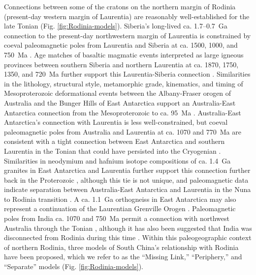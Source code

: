 Connections between some of the cratons on the northern margin of Rodinia (present-day western margin of Laurentia) are reasonably well-established for the late Tonian (Fig. \ref{fig:Rodinia-models}). Siberia's long-lived ca. 1.7--0.7~Ga connection to the present-day northwestern margin of Laurentia is constrained by coeval paleomagnetic poles from Laurentia and Siberia at ca. 1500, 1000, and 750~Ma \citep{Evans2016a}. Age matches of basaltic magmatic events interpreted as large igneous provinces between southern Siberia and northern Laurentia at ca. 1870, 1750, 1350, and 720~Ma further support this Laurentia-Siberia connection \citep{Ernst2016a}. Similarities in the lithology, structural style, metamorphic grade, kinematics, and timing of Mesoproterozoic deformational events between the Albany-Fraser orogen of Australia and the Bunger Hills of East Antarctica \citep{Duebendorfer2002a} support an Australia-East Antarctica connection from the Mesoproterozoic to ca. 95~Ma \citep{Veevers1988a}. Australia-East Antarctica's connection with Laurentia is less well-constrained, but coeval paleomagnetic poles from Australia and Laurentia at ca. 1070 and 770~Ma are consistent with a tight connection between East Antarctica and southern Laurentia in the Tonian \citep{Swanson-Hysell2012a, Eyster2019a} that could have persisted into the Cryogenian \citep{Li2011a}. Similarities in neodymium and hafnium isotope compositions of ca. 1.4~Ga granites in East Antarctica and Laurentia further support this connection further back in the Proterozoic \citep{Goodge2008a}, although this tie is not unique, and paleomagnetic data indicate separation between Australia-East Antarctica and Laurentia in the Nuna to Rodinia transition \citep{Kirscher2020a}. A ca. 1.1~Ga orthogneiss in East Antarctica may also represent a continuation of the Laurentian Grenville Orogen \citep{Goodge2010a}. Paleomagnetic poles from India ca. 1070 and 750~Ma permit a connection with northwest Australia through the Tonian \citep{Swanson-Hysell2012a}, although it has also been suggested that India was disconnected from Rodinia during this time \citep{Merdith2017a}. Within this paleogeographic context of northern Rodinia, three models of South China's relationship with Rodinia have been proposed, which we refer to as the ``Missing Link,'' ``Periphery,'' and ``Separate'' models (Fig. \ref{fig:Rodinia-models}).

